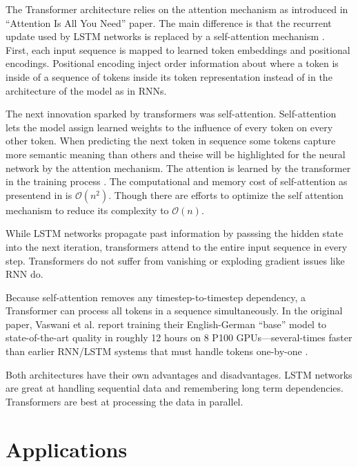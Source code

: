 \documentclass[twoside,a4paper,10pt,DIV=12,BCOR=12mm]{scrartcl}
\begin{document}
The Transformer architecture relies on the attention mechanism as introduced in “Attention Is All You Need” paper.
The main difference is that the recurrent update used by LSTM networks is replaced by a self-attention mechanism \cite{vaswani2017attention}.\\


First, each input sequence is mapped to learned token embeddings and positional encodings. Positional encoding 
inject order information about where a token is inside of a sequence of tokens inside its token representation instead of in the architecture of the model as in RNNs.


The next innovation sparked by transformers was self-attention. Self-attention lets the model assign learned weights to the influence of every token on every other token.
When predicting the next token in sequence some tokens capture more semantic meaning than others and theise will be highlighted for the neural network by the 
attention mechanism. The attention is learned by the transformer in the training process \cite{vaswani2017attention}.
The computational and memory cost of self-attention as presentend in \cite{vaswani2017attention} is $\mathcal{O}(n^2)$. Though there are efforts
to optimize the self attention mechanism to reduce its complexity to $\mathcal{O}(n)$. \cite{katharopoulos2020transformersrnnsfastautoregressive}


While LSTM networks propagate past information by passsing the hidden state into the next iteration, transformers attend to the entire input sequence in every
step. Transformers do not suffer from vanishing or exploding gradient issues like RNN do.


Because self-attention removes any timestep-to-timestep dependency, a Transformer can process all tokens in a sequence simultaneously. 
In the original paper, Vaswani et al. report training their English-German “base” model to state-of-the-art quality in roughly 
12 hours on 8 P100 GPUs—several-times faster than earlier RNN/LSTM systems that must handle tokens one-by-one \cite{vaswani2017attention}.


Both architectures have their own advantages and disadvantages. LSTM networks are great at handling sequential data and 
remembering long term dependencies. Transformers are best at processing the data in parallel.


\section{Applications}
\end{document}
